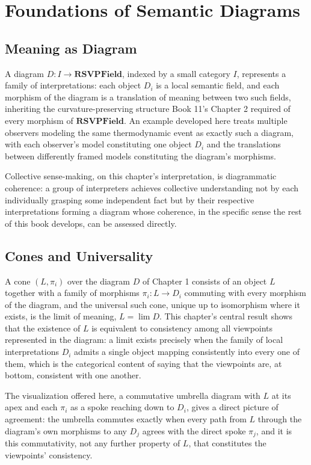 \part{Foundations of Semantic Diagrams}

\chapter{Meaning as Diagram}

A diagram $D: I \to \mathbf{RSVPField}$, indexed by a small category $I$, represents a family of interpretations: each object $D_i$ is a local semantic field, and each morphism of the diagram is a translation of meaning between two such fields, inheriting the curvature-preserving structure Book 11's Chapter 2 required of every morphism of $\mathbf{RSVPField}$. An example developed here treats multiple observers modeling the same thermodynamic event as exactly such a diagram, with each observer's model constituting one object $D_i$ and the translations between differently framed models constituting the diagram's morphisms.

Collective sense-making, on this chapter's interpretation, is diagrammatic coherence: a group of interpreters achieves collective understanding not by each individually grasping some independent fact but by their respective interpretations forming a diagram whose coherence, in the specific sense the rest of this book develops, can be assessed directly.

\chapter{Cones and Universality}

A cone $(L, \pi_i)$ over the diagram $D$ of Chapter 1 consists of an object $L$ together with a family of morphisms $\pi_i: L \to D_i$ commuting with every morphism of the diagram, and the universal such cone, unique up to isomorphism where it exists, is the limit of meaning, $L = \lim D$. This chapter's central result shows that the existence of $L$ is equivalent to consistency among all viewpoints represented in the diagram: a limit exists precisely when the family of local interpretations $D_i$ admits a single object mapping consistently into every one of them, which is the categorical content of saying that the viewpoints are, at bottom, consistent with one another.

The visualization offered here, a commutative umbrella diagram with $L$ at its apex and each $\pi_i$ as a spoke reaching down to $D_i$, gives a direct picture of agreement: the umbrella commutes exactly when every path from $L$ through the diagram's own morphisms to any $D_j$ agrees with the direct spoke $\pi_j$, and it is this commutativity, not any further property of $L$, that constitutes the viewpoints' consistency.

